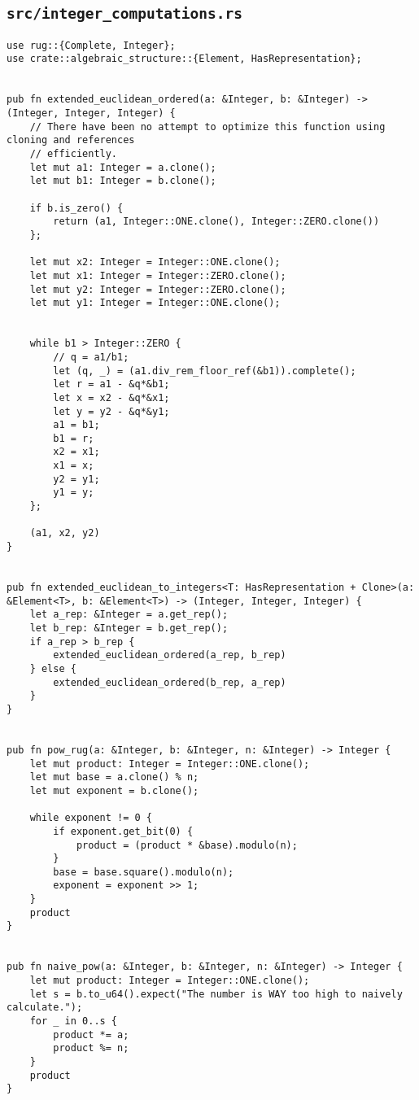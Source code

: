 \subsection{\texttt{src/integer_computations.rs}}
\begin{verbatim}
use rug::{Complete, Integer};
use crate::algebraic_structure::{Element, HasRepresentation};


pub fn extended_euclidean_ordered(a: &Integer, b: &Integer) -> (Integer, Integer, Integer) {
    // There have been no attempt to optimize this function using cloning and references
    // efficiently.
    let mut a1: Integer = a.clone();
    let mut b1: Integer = b.clone();

    if b.is_zero() {
        return (a1, Integer::ONE.clone(), Integer::ZERO.clone())
    };

    let mut x2: Integer = Integer::ONE.clone();
    let mut x1: Integer = Integer::ZERO.clone();
    let mut y2: Integer = Integer::ZERO.clone();
    let mut y1: Integer = Integer::ONE.clone();


    while b1 > Integer::ZERO {
        // q = a1/b1;
        let (q, _) = (a1.div_rem_floor_ref(&b1)).complete();
        let r = a1 - &q*&b1;
        let x = x2 - &q*&x1;
        let y = y2 - &q*&y1;
        a1 = b1;
        b1 = r;
        x2 = x1;
        x1 = x;
        y2 = y1;
        y1 = y;
    };

    (a1, x2, y2)
}


pub fn extended_euclidean_to_integers<T: HasRepresentation + Clone>(a: &Element<T>, b: &Element<T>) -> (Integer, Integer, Integer) {
    let a_rep: &Integer = a.get_rep();
    let b_rep: &Integer = b.get_rep();
    if a_rep > b_rep {
        extended_euclidean_ordered(a_rep, b_rep)
    } else {
        extended_euclidean_ordered(b_rep, a_rep)
    }
}


pub fn pow_rug(a: &Integer, b: &Integer, n: &Integer) -> Integer {
    let mut product: Integer = Integer::ONE.clone();
    let mut base = a.clone() % n;
    let mut exponent = b.clone();

    while exponent != 0 {
        if exponent.get_bit(0) {
            product = (product * &base).modulo(n);
        }
        base = base.square().modulo(n);
        exponent = exponent >> 1;
    }
    product
}


pub fn naive_pow(a: &Integer, b: &Integer, n: &Integer) -> Integer {
    let mut product: Integer = Integer::ONE.clone();
    let s = b.to_u64().expect("The number is WAY too high to naively calculate.");
    for _ in 0..s {
        product *= a;
        product %= n;
    }
    product
}
\end{verbatim}


